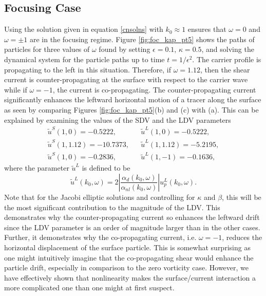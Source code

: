 \documentclass{JFM_Style/jfm}
\begin{document}
\subsection{Focusing Case}

Using the solution given in equation \eqref{cnsolns} with $k_0\approx1$ ensures that $\omega = 0$ and $\omega=\pm 1$ are in the focusing regime.   Figure \ref{fig:foc_kap_pt5} shows the paths of particles for three values of $\omega$ found by setting $\epsilon=0.1$, $\kappa=0.5$, and solving the dynamical system for the particle paths up to time $t=1/\epsilon^{2}$.  The carrier profile is propagating to the left in this situation.  Therefore, if $\omega=1.12$, then the shear current is counter-propagating at the surface with respect to the carrier wave while if $\omega=-1$, the current is co-propagating.  The counter-propagating current significantly enhances the leftward horizontal motion of a tracer along the surface as seen by comparing Figures \ref{fig:foc_kap_pt5}(b) and (c) with (a).  This can be explained by examining the values of the SDV and the LDV parameters
\[
\begin{array}{lcl}
\tilde{u}^{S}(1,0) = -0.5222, & & \tilde{u}^{L}(1,0) = -0.5222,\\
\tilde{u}^{S}(1,1.12) = -10.7373,& & \tilde{u}^{L}(1,1.12) = -5.2195,\\
\tilde{u}^{S}(1,0) = -0.2836, & & \tilde{u}^{L}(1,-1) = -0.1636,
\end{array}
\]
where the parameter $\tilde{u}^{L}$ is defined to be 
\[
\tilde{u}^{L}(k_{0},\omega) = 2\left|\frac{\alpha_{d}(k_{0},\omega)}{\alpha_{nl}(k_{0},\omega)}\right|u^{L}_{p}(k_{0},\omega).
\]
Note that for the Jacobi elliptic solutions and controlling for $\kappa$ and $\beta$, this will be the most significant contribution to the magnitude of the LDV.  This demonstrates why the counter-propagating current so enhances the leftward drift since the LDV parameter is an order of magnitude larger than in the other cases.    Further, it demonstrates why the co-propagating current, i.e. $\omega=-1$, reduces the horizontal displacement of the surface particle.  This is somewhat surprising as one might intuitively imagine that the co-propagating shear would enhance the particle drift, especially in comparison to the zero vorticity case.  However, we have effectively shown that nonlinearity makes the surface/current interaction a more complicated one than one might at first suspect.  
\end{document}
